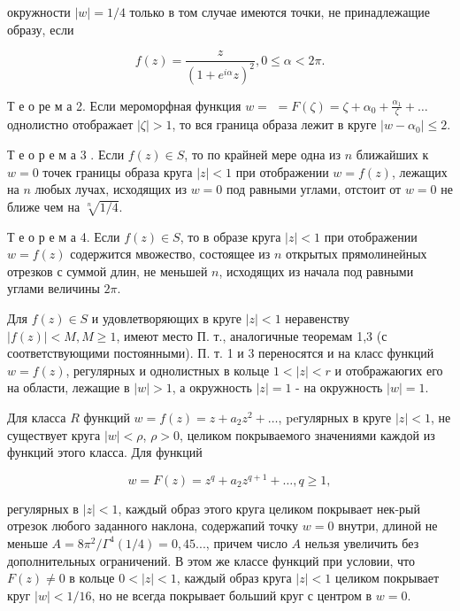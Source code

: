 \documentclass[10pt]{article}
\begin{document}
окружности $|w|=1 / 4$ только в том случае имеются точки, не принадлежащие образу, если



\[

f(z)=\frac{z}{\left(1+e^{i \alpha} z\right)^{2}}, 0 \leqslant \alpha<2 \pi .

\]



Т е о ре м а 2. Если мероморфная функция $w=$ $=F(\zeta)=\zeta+\alpha_{0}+\frac{\alpha_{1}}{\zeta}+\ldots$ однолистно отображает $|\zeta|>1$, то вся граница образа лежит в круге $\left|w-\alpha_{0}\right| \leqslant 2$.



Т е о р е м а 3 . Если $f(z) \in S$, то по крайней мере одна из $n$ ближайших к $w=0$ точек границы образа круга $|z|<1$ при отображении $w=f(z)$, лежащих на $n$ любых лучах, исходящих из $w=0$ под равными углами, отстоит от $w=0$ не ближе чем на $\sqrt[n]{1 / 4}$.



Т е о р е м а 4. Если $f(z) \in S$, то в образе круга $|z|<1$ при отображении $w=f(z)$ содержится мвожество, состоящее из $n$ открытых прямолинейных отрезков с суммой длин, не меньшей $n$, исходящих из начала под равными углами величины $2 \pi$.



Для $f(z) \in S$ и удовлетворяющих в круге $|z|<1$ неравенству $|f(z)|<M, M \geqslant 1$, имеют место П. т., аналогичные теоремам 1,3 (с соответствующими постоянными). П. т. 1 и 3 переносятся и на класс функций $w=f(z)$, регулярных и однолистных в кольце $1<|z|<r$ и отображаюгих его на области, лежащие в $|w|>1$, а окружность $|z|=1$ - на окружность $|w|=1$.



Для класса $R$ функций $w=f(z)=z+a_{2} z^{2}+\ldots$, peгулярных в круге $|z|<1$, не существует круга $|w|<\rho$, $\rho>0$, целиком покрываемого значениями каждой из функций этого класса. Для функций



\[

w=F(z)=z^{q}+a_{2} z^{q+1}+\ldots, q \geqslant 1,

\]



регулярных в $|z|<1$, каждый образ этого круга целиком покрывает нек-рый отрезок любого заданного наклона, содержапий точку $w=0$ внутри, длиной не меньше $A=8 \pi^{2} / \Gamma^{4}(1 / 4)=0,45 . . .$, причем число $A$ нельзя увеличить без дополнительных ограничений. В этом же классе функций при условии, что $F(z) \neq 0$ в кольце $0<|z|<1$, каждый образ круга $|z|<1$ целиком покрывает круг $|w|<1 / 16$, но не всегда покрывает больший круг с центром в $w=0$.
\end{document}
